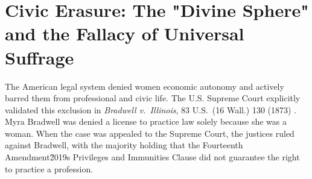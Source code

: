 \section{Civic Erasure: The "Divine Sphere" and the Fallacy of Universal Suffrage}

The American legal system denied women economic autonomy and actively barred them from professional and civic life. The U.S. Supreme Court explicitly validated this exclusion in \textit{Bradwell v.\ Illinois}, 83 U.S.\ (16 Wall.) 130 (1873) \cite{bradwell}. Myra Bradwell was denied a license to practice law solely because she was a woman. When the case was appealed to the Supreme Court, the justices ruled against Bradwell, with the majority holding that the Fourteenth Amendment\u2019s Privileges and Immunities Clause did not guarantee the right to practice a profession.

